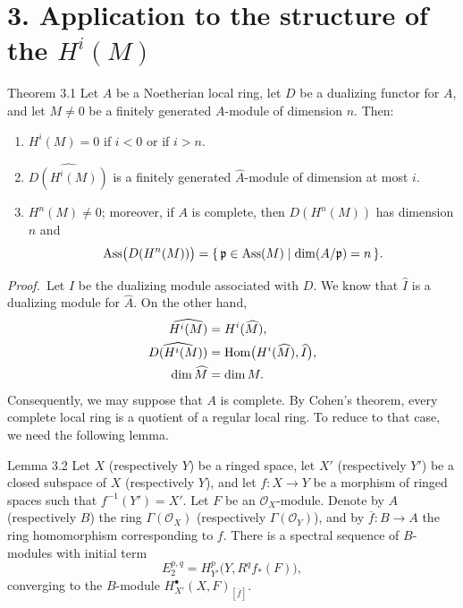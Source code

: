 \section*{3. Application to the structure of the $H^i(M)$}

\begin{sgatheorem}{Theorem 3.1}
Let $A$ be a Noetherian local ring, let $D$ be a dualizing functor for $A$,
and let $M\ne 0$ be a finitely generated $A$-module of dimension $n$.
Then:
\begin{enumerate}
  \item[(i)] $H^i(M)=0$ if $i<0$ or if $i>n$.

  \item[(ii)] $\widehat{D(H^i(M))}$ is a finitely generated
  $\widehat A$-module of dimension at most $i$.

  \item[(iii)] $H^n(M)\ne 0$; moreover, if $A$ is complete, then
  $D(H^n(M))$ has dimension $n$ and
  \[
    \operatorname{Ass}\bigl(D(H^n(M))\bigr)
      =\{\,\mathfrak p\in\operatorname{Ass}(M)\mid \dim(A/\mathfrak p)=n\,\}.
  \]
\end{enumerate}
\end{sgatheorem}

\par{}\noindent\textit{Proof.}\ 
Let $I$ be the dualizing module associated with $D$. We know that
$\widehat I$ is a dualizing module for $\widehat A$. On the other hand,
\begin{align*}
  \widehat{H^i(M)}&=H^i(\widehat M),\\
  \widehat{D(H^i(M))}&=\operatorname{Hom}\bigl(H^i(\widehat M),\widehat I\bigr),\\
  \dim\widehat M&=\dim M.
\end{align*}
Consequently, we may suppose that $A$ is complete. By Cohen's
theorem, every complete local ring is a quotient of a regular local ring.
To reduce to that case, we need the following lemma.

\begin{sgalemma}{Lemma 3.2}
Let $X$ (respectively $Y$) be a ringed space, let $X'$ (respectively $Y'$)
be a closed subspace of $X$ (respectively $Y$), and let
$f\colon X\to Y$ be a morphism of ringed spaces such that
$f^{-1}(Y')=X'$. Let $F$ be an $\mathcal O_X$-module. Denote by $A$
(respectively $B$) the ring $\Gamma(\mathcal O_X)$ (respectively
$\Gamma(\mathcal O_Y)$), and by $\overline f\colon B\to A$ the ring
homomorphism corresponding to $f$. There is a spectral sequence of
$B$-modules with initial term
\begin{equation}\tag{15}\label{eq:V.15}
  E_2^{p,q}=H_{Y'}^p\bigl(Y,R^q f_*(F)\bigr),
\end{equation}
converging to the $B$-module
$H_{X'}^{\bullet}(X,F)_{[\overline f]}$.
\end{sgalemma}


